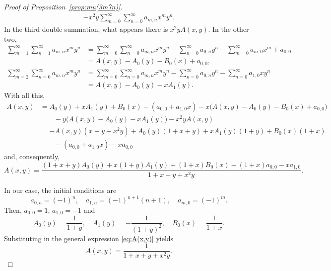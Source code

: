 \documentclass[11pt, a4paper]{article}
\theoremstyle{plain}
\theoremstyle{definition}
\begin{document}
\begin{proof}[Proof of Proposition~\ref{prop:mu(3m7n)}]
\begin{align*}
  - x^2 y \sum_{m=0}^{\infty} \sum_{n=0}^{\infty} a_{m,n} x^m y^n.
\end{align*}
In the third double summation, what appears there is $x^2 y A(x,y)$.
In the other two,
\begin{align*}
  \sum_{m=1}^{\infty} \sum_{n=1}^{\infty} a_{m,n} x^m y^n
  &= \sum_{m=0}^{\infty} \sum_{n=0}^{\infty} a_{m,n} x^m y^n
  - \sum_{n=0}^{\infty} a_{0,n} y^n
  - \sum_{m=0}^{\infty} a_{m,0} x^m
  + a_{0,0} \\
  &= A(x,y) - A_0(y) - B_0(x) + a_{0,0},
  \\
  \sum_{m=2}^{\infty} \sum_{n=0}^{\infty} a_{m,n} x^m y^n
  &= \sum_{m=0}^{\infty} \sum_{n=0}^{\infty} a_{m,n} x^m y^n
  - \sum_{n=0}^{\infty} a_{0,n} y^n
  - \sum_{n=0}^{\infty} a_{1,0} xy^n \\
  &= A(x,y) - A_0(y) - x A_1(y).
\end{align*}
With all this,
\begin{align*}
  A(x,y) &= 
  A_0(y) + xA_1(y) + B_0(x) - (a_{0,0} + a_{1,0}x) 
  - x \Big( A(x,y) - A_0(y) - B_0(x) + a_{0,0} \Big) \\
  &\qquad 
  - y \Big( A(x,y) - A_0(y) - x A_1(y) \Big)
  - x^2 y A(x,y) \\
  &= -A(x,y) (x + y + x^2y) + A_0(y) (1 + x + y) + x A_1(y) (1 + y) 
  + B_0(x) ( 1 + x ) \\
  &\qquad - (a_{0,0} + a_{1,0}x) - x a_{0,0}
\end{align*}
and, consequently,
\begin{equation}
\label{eq:A(x,y)}
  A(x,y) = \frac{(1+x+y)A_0(y) + x(1+y)A_1(y) + (1+x)B_0(x) - (1+x)a_{0,0} - x a_{1,0}}{1+x+y+x^2y}.
\end{equation}

In our case, the initial conditions are
\begin{equation*}
  a_{0,n} = (-1)^n, \quad
  a_{1,n} = (-1)^{n+1}(n+1), \quad
  a_{m,0} = (-1)^m.
\end{equation*}
Then, $a_{0,0} = 1$, $a_{1,0} = -1$ and
\begin{equation*}
  A_0(y) = \frac{1}{1+y}, \quad
  A_1(y) = -\frac{1}{(1+y)^2}, \quad
  B_0(x) = \frac{1}{1+x}.
\end{equation*}
Substituting in the general expression \eqref{eq:A(x,y)} yields 
\begin{equation}
\label{eq:genA} 
  A(x,y) = \frac{1}{1+x+y+x^2y}.
\end{equation}


\end{proof}
\end{document}
